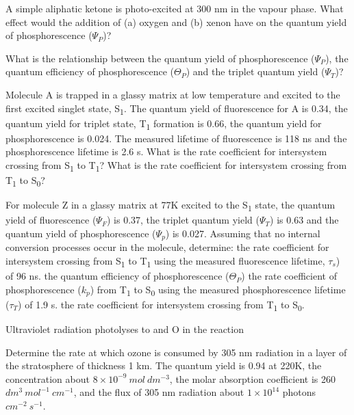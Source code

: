 \documentclass[a4paper,12pt,titlepage]{article}
\begin{document}
\begin{ExerciseList}
\Exercise A simple aliphatic ketone is photo-excited at 300 nm in the vapour phase. What effect would the addition of (a) oxygen and (b) xenon have on the quantum yield of phosphorescence (\(\Psi_P\))?

\Exercise What is the relationship between the quantum yield of phosphorescence (\(\Psi_P\)), the quantum efficiency of phosphorescence (\(\Theta_P\)) and the triplet quantum yield (\(\Psi_T\))?

\Exercise Molecule A is trapped in a glassy matrix at low temperature and excited to the first excited singlet state, S\textsubscript{1}. The quantum yield of fluorescence for A is 0.34, the quantum yield for triplet state, T\textsubscript{1} formation is 0.66, the quantum yield for phosphorescence is 0.024. The measured lifetime of fluorescence is 118 ns and the phosphorescence lifetime is 2.6 s.
\Question What is the rate coefficient for intersystem crossing from S\textsubscript{1} to T\textsubscript{1}?
\Question What is the rate coefficient for intersystem crossing from T\textsubscript{1} to S\textsubscript{0}?

\Exercise For molecule Z in a glassy matrix at 77K excited to the S\textsubscript{1} state, the quantum yield of fluorescence (\(\Psi_F\)) is 0.37, the triplet quantum yield (\(\Psi_T\)) is 0.63 and the quantum yield of phosphorescence (\(\Psi_p\)) is 0.027. Assuming that no internal conversion processes occur in the molecule, determine:
\Question the rate coefficient for intersystem crossing from S\textsubscript{1} to T\textsubscript{1} using the measured fluorescence lifetime, \(\tau_s\)) of 96 ns.
\Question the quantum efficiency of phosphorescence (\(\Theta_P\))
\Question the rate coefficient of phosphorescence (\(k_p\)) from T\textsubscript{1} to S\textsubscript{0} using the measured phosphorescence lifetime (\(\tau_T\)) of 1.9 s.
\Question the rate coefficient for intersystem crossing from T\textsubscript{1} to S\textsubscript{0}.

\end{ExerciseList}

\begin{Exercise}[label = ex1]
Ultraviolet radiation photolyses  to  and O in the reaction 

Determine the rate at which ozone is consumed by 305 nm radiation in a layer of the stratosphere of thickness 1 km. The quantum yield is 0.94 at 220K, the concentration about \(8\times10^{-9}\ mol\ dm^{-3}\), the molar absorption coefficient is 260 \(dm^3\ mol^{-1}\ cm^{-1}\), and the flux of 305 nm radiation about \(1\times 10^{14}\) photons \(cm^{-2}\ s^{-1}\).

\end{Exercise}
\end{document}
